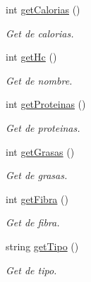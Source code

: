 \begin{DoxyCompactItemize}
int \hyperlink{classIngrediente_af131afb15b12f3b24c9099528245d84b}{get\+Calorias} ()
\begin{DoxyCompactList}\small\item\em Get de calorias. \end{DoxyCompactList}\item 
int \hyperlink{classIngrediente_a411c8e40f95b5afb10b06cc334160fd8}{get\+Hc} ()
\begin{DoxyCompactList}\small\item\em Get de nombre. \end{DoxyCompactList}\item 
int \hyperlink{classIngrediente_a8ae9688c30eb438cf8988c4707dc38d1}{get\+Proteinas} ()
\begin{DoxyCompactList}\small\item\em Get de proteinas. \end{DoxyCompactList}\item 
int \hyperlink{classIngrediente_af61e31d75a5d6a0c9b7325ada831f32e}{get\+Grasas} ()
\begin{DoxyCompactList}\small\item\em Get de grasas. \end{DoxyCompactList}\item 
int \hyperlink{classIngrediente_a821f8c29400ef5059baf4f9d3fc536b5}{get\+Fibra} ()
\begin{DoxyCompactList}\small\item\em Get de fibra. \end{DoxyCompactList}\item 
string \hyperlink{classIngrediente_ae44bb56a5b2a8d3bc532b053aba8e52a}{get\+Tipo} ()
\begin{DoxyCompactList}\small\item\em Get de tipo. \end{DoxyCompactList}\end{DoxyCompactItemize}
